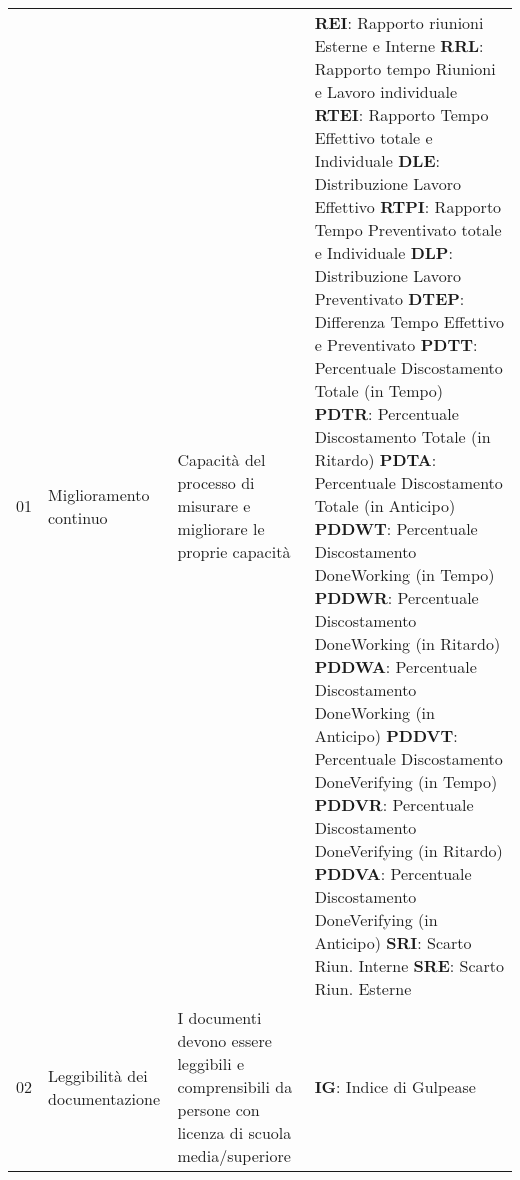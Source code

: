 \begin{longtable}{ 
		>{}p{} 
		>{}p{}
        >{}p{}
        >{\centering}p{} }
        01 & Miglioramento continuo & Capacità del processo di misurare e migliorare le proprie capacità & 
                         \textbf{REI}: Rapporto riunioni Esterne e Interne \newline
                         \textbf{RRL}: Rapporto tempo Riunioni e Lavoro individuale \newline
                         \textbf{RTEI}: Rapporto Tempo Effettivo totale e Individuale \newline
                         \textbf{DLE}: Distribuzione Lavoro Effettivo \newline
                         \textbf{RTPI}: Rapporto Tempo Preventivato totale e Individuale \newline
                         \textbf{DLP}: Distribuzione Lavoro Preventivato \newline 
                         \textbf{DTEP}: Differenza Tempo Effettivo e Preventivato \newline 
                         \textbf{PDTT}: Percentuale Discostamento Totale (in Tempo) \newline 
                         \textbf{PDTR}: Percentuale Discostamento Totale (in Ritardo) \newline 
                         \textbf{PDTA}: Percentuale Discostamento Totale (in Anticipo) \newline 
                         \textbf{PDDWT}: Percentuale Discostamento DoneWorking (in Tempo) \newline 
                         \textbf{PDDWR}: Percentuale Discostamento DoneWorking (in Ritardo) \newline 
                         \textbf{PDDWA}: Percentuale Discostamento DoneWorking (in Anticipo) \newline 
                         \textbf{PDDVT}: Percentuale Discostamento DoneVerifying (in Tempo) \newline
                         \textbf{PDDVR}: Percentuale Discostamento DoneVerifying (in Ritardo) \newline
                         \textbf{PDDVA}: Percentuale Discostamento DoneVerifying (in Anticipo) \newline
                         \textbf{SRI}: Scarto Riun. Interne \newline 
                         \textbf{SRE}: Scarto Riun. Esterne 
                         \tabularnewline

        02 & Leggibilità dei documentazione & I documenti devono essere leggibili e comprensibili da persone con licenza di scuola media/superiore & \textbf{IG}: Indice di Gulpease \tabularnewline


\end{longtable}
